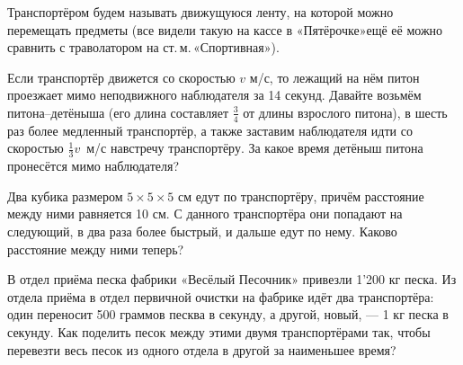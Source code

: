 ﻿
\noindent Транспортёром будем называть движущуюся ленту, на которой можно перемещать предметы (все видели такую на кассе в «Пятёрочке»\scolon ещё её можно сравнить с траволатором на ст.\,м.\,«Спортивная»).

\begin{enumerate}
\itA Если транспортёр движется со скоростью $v$ м/с, то лежащий на нём питон проезжает мимо неподвижного наблюдателя за 14 секунд. Давайте возьмём питона–детёныша (его длина составляет $\tfrac{3}{4}$ от длины взрослого питона), в шесть раз более медленный транспортёр, а также заставим наблюдателя идти со скоростью $\tfrac{1}{3}v$~м/с навстречу транспортёру. За какое время детёныш питона пронесётся мимо наблюдателя?

\itB Два кубика размером $5 \times 5 \times 5$ см едут по транспортёру, причём расстояние между ними равняется 10 см. С данного транспортёра они попадают на следующий, в два раза более быстрый, и дальше едут по нему. Каково расстояние между ними теперь?

\itC В отдел приёма песка фабрики «Весёлый Песочник» привезли 1'200 кг песка. Из отдела приёма в отдел первичной очистки на фабрике идёт два транспортёра: один переносит 500 граммов песква в секунду, а другой, новый, — 1 кг песка в секунду. Как поделить песок между этими двумя транспортёрами так, чтобы перевезти весь песок из одного отдела в другой за наименьшее время?
\end{enumerate}